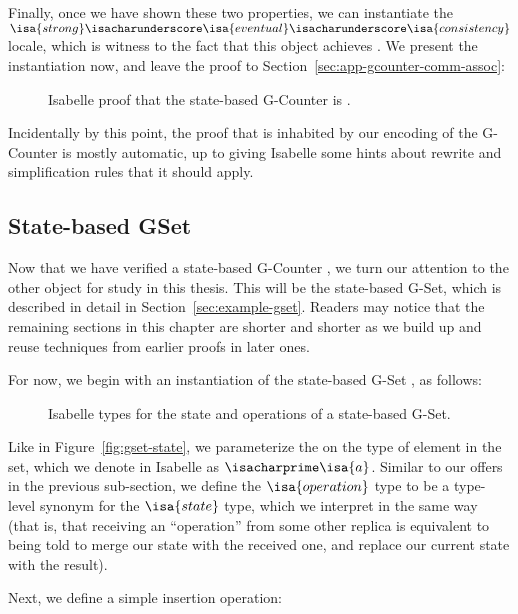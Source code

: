 Finally, once we have shown these two properties, we can instantiate the
$\isa{strong}\isacharunderscore\isa{eventual}\isacharunderscore\isa{consistency}$
locale, which is witness to the fact that this \CRDT object achieves \SEC. We
present the instantiation now, and leave the proof to
Section~\ref{sec:app-gcounter-comm-assoc}:

\begin{figure}[H]
  
  \caption{Isabelle proof that the state-based G-Counter \CRDT is \SEC.}
\end{figure}

Incidentally by this point, the proof that \SEC is inhabited by our encoding of
the G-Counter \SEC is mostly automatic, up to giving Isabelle some hints about
rewrite and simplification rules that it should apply.

\TODO

\subsection{State-based GSet}

Now that we have verified a state-based G-Counter \CRDT, we turn our attention
to the other \CRDT object for study in this thesis. This will be the state-based
G-Set, which is described in detail in Section~\ref{sec:example-gset}. Readers
may notice that the remaining sections in this chapter are shorter and shorter
as we build up and reuse techniques from earlier proofs in later ones.

For now, we begin with an instantiation of the state-based G-Set \CRDT, as
follows:

\begin{figure}[H]
  
  \caption{Isabelle types for the state and operations of a state-based G-Set.}
\end{figure}

Like in Figure~\ref{fig:gset-state}, we parameterize the \CRDT on the type of
element in the set, which we denote in Isabelle as $\isacharprime\isa{a}$.
Similar to our offers in the previous sub-section, we define the
$\isa{operation}$ type to be a type-level synonym for the $\isa{state}$ type,
which we interpret in the same way (that is, that receiving an ``operation''
from some other replica is equivalent to being told to merge our state with the
received one, and replace our current state with the result).

Next, we define a simple insertion operation:

